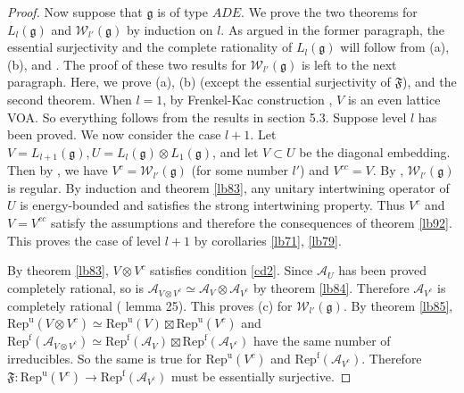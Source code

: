 \documentclass[11pt,b5paper,notitlepage]{article}
\theoremstyle{definition}
\theoremstyle{plain}
\newcommand{\fk}{\mathfrak}
\newcommand{\mc}{\mathcal}
\newcommand{\Repu}{\mathrm{Rep}^{\mathrm u}}
\newcommand{\gk}{\mathfrak g}
\newcommand{\Repf}{\mathrm{Rep}^{\mathrm f}}
\numberwithin{equation}{subsection}
\begin{document}
\begin{proof}
Now suppose that $\gk$ is of type $ADE$. We prove the two theorems for $L_l(\gk)$ and $\mc W_{l'}(\gk)$ by induction on $l$. As argued in the former paragraph, the essential surjectivity and the complete rationality of $L_l(\gk)$ will follow from (a), (b), and \cite{LX04,Hen19,MTW18}. The proof of these two results for $\mc W_{l'}(\gk)$ is left to the next paragraph. Here, we prove (a), (b) (except the essential surjectivity of $\fk F$), and the second theorem. When $l=1$, by  Frenkel-Kac construction \cite{FK80}, $V$ is an even lattice VOA. So everything follows from the results in \cite{Gui21a} section 5.3.  Suppose level $l$ has been proved. We now consider the case $l+1$. Let $V=L_{l+1}(\gk),U=L_l(\gk)\otimes L_1(\gk)$, and let $V\subset U$ be the diagonal embedding. Then by \cite{ACL19}, we have $V^c=\mc W_{l'}(\gk)$ (for some number $l'$) and $V^{cc}=V$. By \cite{Ara15a,Ara15b}, $\mc W_{l'}(\gk)$ is regular. By induction and theorem \ref{lb83}, any  unitary intertwining operator of $U$ is energy-bounded and satisfies the strong intertwining property. Thus  $V^c$ and  $V=V^{cc}$ satisfy the assumptions and therefore the consequences of theorem \ref{lb92}. This proves the case of level $l+1$ by corollaries \ref{lb71},  \ref{lb79}.

By theorem \ref{lb83}, $V\otimes V^c$ satisfies condition \ref{cd2}. Since $\mc A_U$ has been proved completely rational, so is $\mc A_{V\otimes V^c}\simeq\mc A_V\otimes \mc A_{V^c}$ by theorem \ref{lb84}. Therefore $\mc A_{V^c}$ is completely rational (\cite{Lon03} lemma 25). This proves (c) for $\mc W_{l'}(\gk)$. By theorem \ref{lb85}, $\Repu(V\otimes V^c)\simeq \Repu(V)\boxtimes\Repu(V^c)$ and  $\Repf(\mc A_{V\otimes V^c})\simeq\Repf(\mc A_V)\boxtimes \Repf(\mc A_{V^c})$ have the same number of irreducibles. So the same is true for $\Repu(V^c)$ and $\Repf(\mc A_{V^c})$. Therefore $\fk F:\Repu(V^c)\rightarrow\Repf(\mc A_{V^c})$ must be essentially surjective.
\end{proof}
\end{document}
